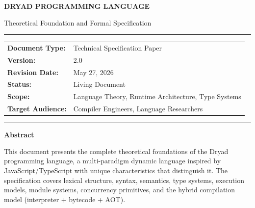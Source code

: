\documentclass[12pt,a4paper]{article}
\theoremstyle{definition}
\begin{document}
\begin{titlepage}
\begin{center}

\vspace*{1cm}


\vspace{1.5cm}

{\Huge\bfseries\color{dryadgreen}
DRYAD PROGRAMMING LANGUAGE
}

\vspace{0.5cm}

{\Large
Theoretical Foundation and Formal Specification
}

\vspace{1.5cm}

\noindent\rule{\textwidth}{1pt}

\vspace{0.8cm}

\begin{tabular}{ll}
\textbf{Document Type:} & Technical Specification Paper \\
\textbf{Version:} & 2.0 \\
\textbf{Revision Date:} & May 27, 2026 \\
\textbf{Status:} & Living Document \\
\textbf{Scope:} & Language Theory, Runtime Architecture, Type Systems \\
\textbf{Target Audience:} & Compiler Engineers, Language Researchers \\
\end{tabular}

\vspace{0.8cm}

\noindent\rule{\textwidth}{1pt}

\vspace{1.5cm}

\begin{mdframed}[linecolor=dryadgreen, linewidth=2pt, roundcorner=5pt]
\textbf{\large Abstract}

\vspace{0.3cm}

This document presents the complete theoretical foundations of the Dryad programming language, a multi-paradigm dynamic language inspired by JavaScript/TypeScript with unique characteristics that distinguish it. The specification covers lexical structure, syntax, semantics, type systems, execution models, module systems, concurrency primitives, and the hybrid compilation model (interpreter + bytecode + AOT). 


\end{mdframed}
\end{center}
\end{titlepage}
\end{document}
